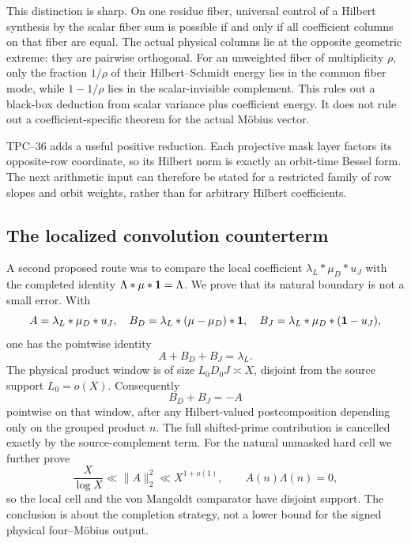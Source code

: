 This distinction is sharp.  On one residue fiber, universal control of
a Hilbert synthesis by the scalar fiber sum is possible if and only if
all coefficient columns on that fiber are equal.  The actual physical
columns lie at the opposite geometric extreme: they are pairwise
orthogonal.  For an unweighted fiber of multiplicity \(\rho\), only the
fraction \(1/\rho\) of their Hilbert--Schmidt energy lies in the common
fiber mode, while \(1-1/\rho\) lies in the scalar-invisible complement.
This rules out a black-box deduction from scalar variance plus
coefficient energy.  It does not rule out a coefficient-specific theorem
for the actual M\"obius vector.

TPC--36 adds a useful positive reduction.  Each projective mask layer
factors its opposite-row coordinate, so its Hilbert norm is exactly an
orbit-time Bessel form.  The next arithmetic input can therefore be
stated for a restricted family of row slopes and orbit weights, rather
than for arbitrary Hilbert coefficients.

\subsection{The localized convolution counterterm}

A second proposed route was to compare the local coefficient
\(\lambda_L*\mu_D*u_J\) with the completed identity
\(\Lambda*\mu*\mathbf 1=\Lambda\).  We prove that its natural boundary is not
a small error.  With
\begin{equation}
 A=\lambda_L*\mu_D*u_J,
 \quad
 B_D=\lambda_L*(\mu-\mu_D)*\mathbf 1,
 \quad
 B_J=\lambda_L*\mu_D*(\mathbf 1-u_J),
 \label{eq:tpc42-intro-three-faces}
\end{equation}
one has the pointwise identity
\begin{equation}
 A+B_D+B_J=\lambda_L.
 \label{eq:tpc42-intro-counterterm-identity}
\end{equation}
The physical product window is of size \(L_0D_0J\asymp X\), disjoint
from the source support \(L_0=o(X)\).  Consequently
\begin{equation}
 \boxed{B_D+B_J=-A}
 \label{eq:tpc42-intro-counterterm}
\end{equation}
pointwise on that window, after any Hilbert-valued postcomposition
depending only on the grouped product \(n\).  The full shifted-prime
contribution is
cancelled exactly by the source-complement term.  For the natural
unmasked hard cell we further prove
\begin{equation}
 \frac{X}{\log X}\ll\|A\|_2^2\ll X^{1+o(1)},
 \qquad
 A(n)\Lambda(n)=0,
 \label{eq:tpc42-intro-boundary-size}
\end{equation}
so the local cell and the von Mangoldt comparator have disjoint support.
The conclusion is about the completion strategy, not a lower bound for
the signed physical four--M\"obius output.

